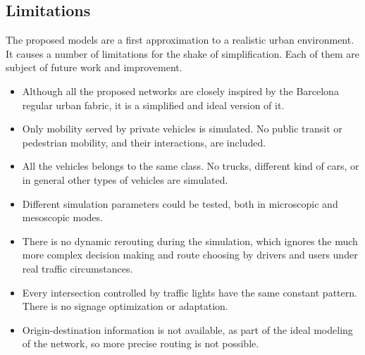 \documentclass[11pt]{article}
\begin{document}


\subsection{Limitations}
The proposed models are a first approximation to a realistic urban environment. It causes a number of limitations for the shake of simplification. Each of them are subject of future work and improvement.

\begin{itemize}
\setlength\itemsep{0.05em}
    \item Although all the proposed networks are closely inspired by the Barcelona regular urban fabric, it is a simplified and ideal version of it.
    \item Only mobility served by private vehicles is simulated. No public transit or pedestrian mobility, and their interactions, are included.
    \item All the vehicles belongs to the same class. No trucks, different kind of cars, or in general other types of vehicles are simulated.
    \item Different simulation parameters could be tested, both in microscopic and mesoscopic modes.
    \item There is no dynamic rerouting during the simulation, which ignores the much more complex decision making and route choosing by drivers and users under real traffic circumstances.
    \item Every intersection controlled by traffic lights have the same constant pattern. There is no signage optimization or adaptation.
    \item Origin-destination information is not available, as part of the ideal modeling of the network, so more precise routing is not possible.
\end{itemize}
\end{document}
